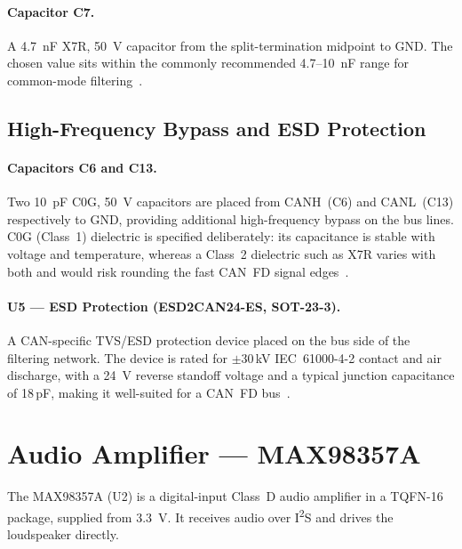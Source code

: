 \paragraph{Capacitor C7.}
A \SI{4.7}{\nano\farad} X7R, \SI{50}{\volt} capacitor from the split-termination midpoint
to GND. The chosen value sits within the commonly recommended 4.7--\SI{10}{\nano\farad}
range for common-mode filtering~\cite{ref17}.

\subsection{High-Frequency Bypass and ESD Protection}
\label{subsec:can-hf}

\paragraph{Capacitors C6 and C13.}
Two \SI{10}{\pico\farad} C0G, \SI{50}{\volt} capacitors are placed from CANH~(C6) and
CANL~(C13) respectively to GND, providing additional high-frequency bypass on the bus
lines. C0G (Class~1) dielectric is specified deliberately: its capacitance is stable with
voltage and temperature, whereas a Class~2 dielectric such as X7R varies with both and
would risk rounding the fast CAN~FD signal edges~\cite{ref19,ref20}.

\paragraph{U5 --- ESD Protection (ESD2CAN24-ES, SOT-23-3).}
A CAN-specific TVS/ESD protection device placed on the bus side of the filtering network.
The device is rated for $\pm$30\,kV IEC~61000-4-2 contact and air discharge, with a
\SI{24}{\volt} reverse standoff voltage and a typical junction capacitance of 18\,pF,
making it well-suited for a CAN~FD bus~\cite{ref11}.

\section{Audio Amplifier --- MAX98357A}
\label{sec:audio}

The MAX98357A (U2) is a digital-input Class~D audio amplifier in a TQFN-16 package,
supplied from \SI{3.3}{\volt}. It receives audio over I\textsuperscript{2}S and drives
the loudspeaker directly.

